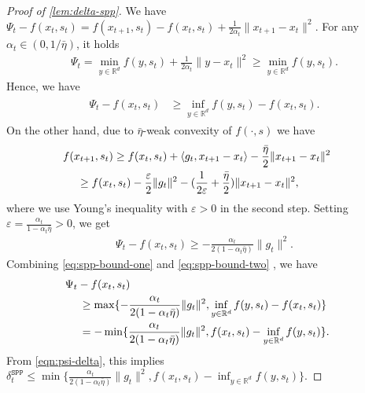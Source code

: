 \documentclass{article}
\let\temp\phi
\let\phi\varphi
\let\varphi\temp
\let\temp\varepsilon
\let\epsilon\varepsilon
\let\varepsilon\temp
\newcommand{\iprod}[2]{\langle #1, #2 \rangle}
\newcommand{\R}{\mathbb{R}}
\newcommand{\SPP}{{\texttt{SPP}}}
\theoremstyle{plain}
\theoremstyle{definition}
\theoremstyle{remark}
\begin{document}
\begin{proof}[Proof of \cref{lem:delta-spp}]
    We have
    $\Psi_t  - f(x_t,s_t) = f(x_{t+1}, s_t) - f(x_t,s_t) + \frac{1}{2\alpha_t}\|x_{t+1}-x_t\|^2.$
    For any $\alpha_t \in (0, 1/\bar{\eta})$, it holds
    \begin{align*}
        \Psi_t = \min_{y\in \R^d} f(y,s_t) + \frac{1}{2\alpha_t}\|y-x_t\|^2
        \geq \min_{y\in \R^d} f(y,s_t).
    \end{align*}
    Hence, we have
    \begin{align}\label{eq:spp-bound-one}
    \begin{split}
        \Psi_t  - f(x_t,s_t) &\geq \inf_{y\in \R^d} f(y,s_t) - f(x_t,s_t).
    \end{split}
    \end{align}
    On the other hand, due to $\bar{\eta}$-weak convexity of $f(\cdot,s)$ we have
    \begin{align*}
        & \hspace{-3ex} f(x_{t+1},s_t) \geq f(x_t,s_t) + \iprod{g_t}{x_{t+1}-x_t} - \frac{\bar{\eta}}{2}\|x_{t+1}-x_t\|^2 \\
        &\geq f(x_t,s_t) - \frac{\epsilon}{2}\|g_t\|^2 - (\frac{1}{2\epsilon}+ \frac{\bar{\eta}}{2} )\|x_{t+1}-x_t\|^2,
    \end{align*}
    where we use Young's inequality with $\epsilon>0$ in the second step. Setting $\epsilon=\frac{\alpha_t}{1-\alpha_t \bar{\eta}} > 0$, we get
    \begin{align}\label{eq:spp-bound-two}
        \Psi_t - f(x_t,s_t) \geq -\frac{\alpha_t}{2(1-\alpha_t \bar{\eta})}\|g_t\|^2.
    \end{align}
    Combining \eqref{eq:spp-bound-one} and \eqref{eq:spp-bound-two} , we have
    \begin{align*}
        &\hspace{-3ex}\Psi_t - f(x_t,s_t) \\
        & \geq \max\{-\frac{\alpha_t}{2(1-\alpha_t \bar{\eta})}\|g_t\|^2 ,\inf_{y\in \R^d} f(y,s_t) - f(x_t,s_t)\} \\
        &= -\min\{\frac{\alpha_t}{2(1-\alpha_t \bar{\eta})}\|g_t\|^2, f(x_t,s_t) - \inf_{y\in \R^d} f(y,s_t)\}.
    \end{align*}
    From \eqref{eqn:psi-delta}, this implies~$\delta_t^{\SPP{}} \leq \min\{\frac{\alpha_t}{2(1-\alpha_t \bar{\eta})}\|g_t\|^2, f(x_t,s_t) - \inf_{y\in \R^d} f(y,s_t)\}$.
\end{proof}
\end{document}
